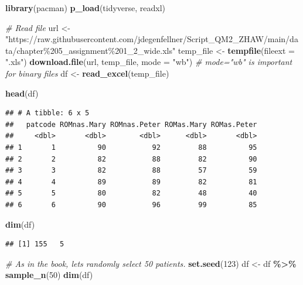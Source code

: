 \documentclass[
]{article}
\newenvironment{Shaded}{\begin{snugshade}}{\end{snugshade}}
\newcommand{\AttributeTok}[1]{\textcolor[rgb]{0.13,0.29,0.53}{#1}}
\newcommand{\CommentTok}[1]{\textcolor[rgb]{0.56,0.35,0.01}{\textit{#1}}}
\newcommand{\DecValTok}[1]{\textcolor[rgb]{0.00,0.00,0.81}{#1}}
\newcommand{\FunctionTok}[1]{\textcolor[rgb]{0.13,0.29,0.53}{\textbf{#1}}}
\newcommand{\NormalTok}[1]{#1}
\newcommand{\OtherTok}[1]{\textcolor[rgb]{0.56,0.35,0.01}{#1}}
\newcommand{\SpecialCharTok}[1]{\textcolor[rgb]{0.81,0.36,0.00}{\textbf{#1}}}
\newcommand{\StringTok}[1]{\textcolor[rgb]{0.31,0.60,0.02}{#1}}
\begin{document}
\begin{Shaded}
\begin{Highlighting}[]
\FunctionTok{library}\NormalTok{(pacman)}
\FunctionTok{p\_load}\NormalTok{(tidyverse, readxl)}

\CommentTok{\# Read file}
\NormalTok{url }\OtherTok{\textless{}{-}} \StringTok{"https://raw.githubusercontent.com/jdegenfellner/Script\_QM2\_ZHAW/main/data/chapter\%205\_assignment\%201\_2\_wide.xls"}
\NormalTok{temp\_file }\OtherTok{\textless{}{-}} \FunctionTok{tempfile}\NormalTok{(}\AttributeTok{fileext =} \StringTok{".xls"}\NormalTok{)}
\FunctionTok{download.file}\NormalTok{(url, temp\_file, }\AttributeTok{mode =} \StringTok{"wb"}\NormalTok{)  }\CommentTok{\# mode="wb" is important for binary files}
\NormalTok{df }\OtherTok{\textless{}{-}} \FunctionTok{read\_excel}\NormalTok{(temp\_file)}

\FunctionTok{head}\NormalTok{(df)}
\end{Highlighting}
\end{Shaded}

\begin{verbatim}
## # A tibble: 6 x 5
##   patcode ROMnas.Mary ROMnas.Peter ROMas.Mary ROMas.Peter
##     <dbl>       <dbl>        <dbl>      <dbl>       <dbl>
## 1       1          90           92         88          95
## 2       2          82           88         82          90
## 3       3          82           88         57          59
## 4       4          89           89         82          81
## 5       5          80           82         48          40
## 6       6          90           96         99          85
\end{verbatim}

\begin{Shaded}
\begin{Highlighting}[]
\FunctionTok{dim}\NormalTok{(df)}
\end{Highlighting}
\end{Shaded}

\begin{verbatim}
## [1] 155   5
\end{verbatim}

\begin{Shaded}
\begin{Highlighting}[]
\CommentTok{\# As in the book, let\textquotesingle{}s randomly select 50 patients.}
\FunctionTok{set.seed}\NormalTok{(}\DecValTok{123}\NormalTok{)}
\NormalTok{df }\OtherTok{\textless{}{-}}\NormalTok{ df }\SpecialCharTok{\%\textgreater{}\%} \FunctionTok{sample\_n}\NormalTok{(}\DecValTok{50}\NormalTok{)}
\FunctionTok{dim}\NormalTok{(df)}
\end{Highlighting}
\end{Shaded}
\end{document}
